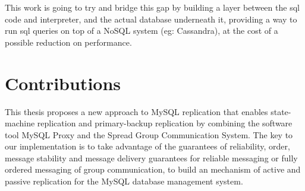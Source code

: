This work is going to try and bridge this gap by building a layer between the \ac{sql} code and interpreter, and the actual database underneath it, providing a way to run \ac{sql} queries on top of a NoSQL system (eg: Cassandra), at the cost of a possible reduction on performance.



%




\section{Contributions}

This thesis proposes a new approach to MySQL replication that enables state-machine replication and primary-backup replication by combining the software tool MySQL Proxy and the Spread Group Communication System.
The key to our implementation is to take advantage of the guarantees of reliability, order, message stability and message delivery guarantees for reliable messaging or fully ordered messaging of group communication, to build an mechanism of active and passive replication for the MySQL database management system.

